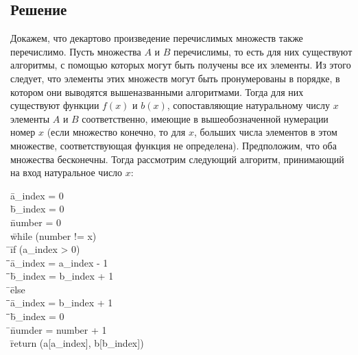 \documentclass[a4paper,12pt]{article}
\newcommand{\tab}{\quad\=}
\newenvironment{programm}{
    \ttfamily
    \smallskip
    \begin{tabbing}
    }
    {
    \end{tabbing}
    \smallskip
}
\begin{document}
	\subsection*{Решение}
	
    Докажем, что декартово произведение перечислимых множеств также перечислимо. Пусть множества $A$ и $B$ перечислимы, то есть для них существуют алгоритмы, с помощью которых могут быть получены все их элементы. Из этого следует, что элементы этих множеств могут быть пронумерованы в порядке, в котором они выводятся вышеназванными алгоритмами. Тогда для них существуют функции $f(x)$ и $b(x)$, сопоставляющие натуральному числу $x$ элементы $A$ и $B$ соответственно, имеющие в вышеобозначенной нумерации номер $x$ (если множество конечно, то для $x$, больших числа элементов в этом множестве, соответствующая функция не определена).  Предположим, что оба множества бесконечны. Тогда рассмотрим следующий алгоритм, принимающий на вход натуральное число $x$:
    \begin{programm}
    \tab a\_index = 0\\
    \tab b\_index = 0\\
    \tab number = 0\\
    \tab while (number != x)\\
    \tab \tab if (a\_index > 0)\\
    \tab \tab \tab a\_index = a\_index - 1\\
    \tab \tab \tab b\_index = b\_index + 1\\
    \tab \tab else\\
    \tab \tab \tab a\_index = b\_index + 1\\
    \tab \tab \tab b\_index = 0\\
    \tab \tab numder = number + 1\\
    \tab return (a[a\_index], b[b\_index])\\
    \end{programm}
	
\end{document}

